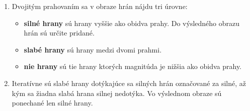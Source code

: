 \begin{enumerate}
        \item Dvojitým prahovaním sa v obraze hrán nájdu tri úrovne:
            \begin{itemize}
                \item \textbf{silné hrany} sú hrany vyššie ako obidva prahy. Do výsledného obrazu hrán sú určite pridané.
                \item \textbf{slabé hrany} sú hrany medzi dvomi prahmi.
                \item \textbf{nie hrany} sú tie hrany ktorých magnitúda je nižšia ako obidva prahy.
            \end{itemize}
            
        \item Iteratívne sú slabé hrany dotýkajúce sa silných hrán označované za silné, až kým sa žiadna slabá hrana silnej nedotýka. Vo výslednom obraze sú ponechané len silné hrany.
    \end{enumerate}


